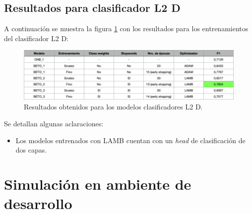 \subsection{Resultados para clasificador L2 D}

A continuación se muestra la figura \ref{fig:res-l2d} con los resultados para los entrenamientos del clasificador L2 D:

\begin{figure}[htbp]
	\centering
	\includegraphics[width=1\textwidth]{./Figures/cap4-resultados-l2d.png}
	\caption{Resultados obtenidos para los modelos clasificadores L2 D.}
	\label{fig:res-l2d}
\end{figure}

Se detallan algunas aclaraciones:
\begin{itemize}
	\item Los modelos entrenados con LAMB cuentan con un \textit{head} de clasificación de dos capas.
\end{itemize}

\section{Simulación en ambiente de desarrollo}


